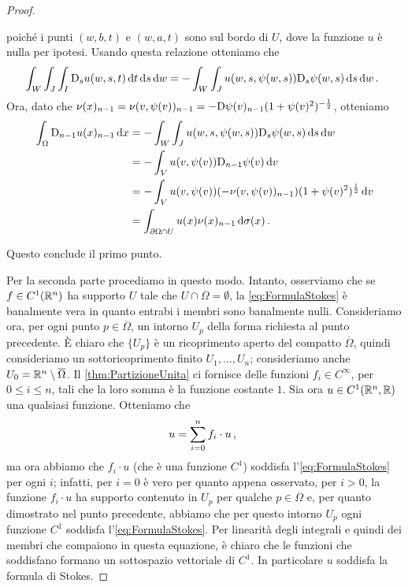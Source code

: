 \begin{proof}
\begin{description}
			poiché i punti $(w,b,t)$ e $(w,a,t)$ sono sul bordo di $U$, dove la funzione $u$ è nulla per ipotesi. Usando questa relazione
			otteniamo che
			\[
				\int_W\int_J\int_I\mathrm D_s u(w,s,t) \,\mathrm d t \,\mathrm d s \,\mathrm d w =-\int_W \int_J u(w,s,\psi(w,s))\mathrm D_s \psi (w,s)\,\mathrm d s\,\mathrm d w\, \text{. }
			\]
			Ora, dato che $\nu(x)_{n-1}=\nu(v,\psi(v))_{n-1}=-\mathrm D\psi(v)_{n-1}(1+\psi(v)^2)^{-\frac{1}{2}}$, otteniamo
			\begin{align*}
				\int_{\Omega} \mathrm D_{n-1} u(x)_{n-1} \,\mathrm d x & = -\int_W \int_J u(w,s,\psi(w,s))\mathrm D_s \psi (w,s) \,\mathrm d s \,\mathrm d w\\
				& = -\int_V u(v,\psi(v))\mathrm D_{n-1} \psi(v) \,\mathrm d v\\
				& = -\int_V u(v,\psi(v))(-\nu(v,\psi(v))_{n-1})(1+\psi(v)^2)^{\frac{1}{2}} \,\mathrm d v\\
				& = \int_{\partial \Omega \cap U} u(x)\nu(x)_{n-1} \,\mathrm d \sigma(x)\, \text{. }
			\end{align*}
	\end{description}
	Questo conclude il primo punto.
	
	Per la seconda parte procediamo in questo modo. Intanto, osserviamo che se $f\in C^1(\mathbb R^n)$ ha supporto $U$ tale che $U\cap \overline\Omega =
	\emptyset$, la \cref{eq:FormulaStokes} è banalmente vera in quanto entrabi i membri sono banalmente nulli.
	Consideriamo ora, per ogni punto $p\in \overline\Omega$, un intorno $U_p$ della forma richiesta al punto precedente. È chiaro che $\{U_p\}$ è un
	ricoprimento aperto del compatto $\overline\Omega$, quindi consideriamo un sottoricoprimento finito $U_1,\dots,U_n$; consideriamo anche
	$U_0=\mathbb R^n \setminus \overline\Omega$. Il \cref{thm:PartizioneUnita} ci fornisce delle funzioni $f_i\in C^{\infty}$, per $0\leq i \leq n$,
	tali che la loro somma è la funzione costante $1$.
	Sia ora $u\in C^1(\mathbb R^n,\mathbb R)$ una qualsiasi funzione. Otteniamo che
	\[
		u = \sum_{i=0}^n f_i\cdot u\, \text{, }
	\]
	ma ora abbiamo che $f_i \cdot u$ (che è una funzione $C^1$) soddisfa l'\cref{eq:FormulaStokes} per ogni $i$; infatti, per $i=0$ è vero
	per quanto appena osservato, per $i>0$, la funzione $f_i \cdot u$ ha supporto contenuto in $U_p$ per qualche $p\in \overline\Omega$ e, per quanto
	dimostrato nel punto precedente, abbiamo che per questo intorno $U_p$ ogni funzione $C^1$ soddisfa l'\cref{eq:FormulaStokes}.
	Per linearità degli integrali e quindi dei membri che compaiono in questa equazione, è chiaro che le funzioni che soddisfano formano
	un sottospazio vettoriale di $C^1$. In particolare $u$ soddisfa la formula di Stokes.
\end{proof}

